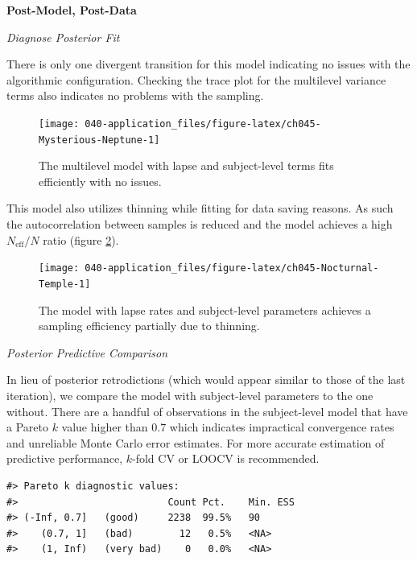 \documentclass[11pt, oneside, openany]{scrbook}
\begin{document}
\textbf{Post-Model, Post-Data}

\emph{Diagnose Posterior Fit}

There is only one divergent transition for this model indicating no issues with the algorithmic configuration. Checking the trace plot for the multilevel variance terms also indicates no problems with the sampling.

\begin{figure}

{\centering \texttt{[image: 040-application\_files/figure-latex/ch045-Mysterious-Neptune-1]} 

}

\caption{The multilevel model with lapse and subject-level terms fits efficiently with no issues.}\label{fig:ch045-Mysterious-Neptune}
\end{figure}

This model also utilizes thinning while fitting for data saving reasons. As such the autocorrelation between samples is reduced and the model achieves a high \(N_{\mathrm{eff}}/N\) ratio (figure \ref{fig:ch045-Nocturnal-Temple}).

\begin{figure}

{\centering \texttt{[image: 040-application\_files/figure-latex/ch045-Nocturnal-Temple-1]} 

}

\caption{The model with lapse rates and subject-level parameters achieves a sampling efficiency partially due to thinning.}\label{fig:ch045-Nocturnal-Temple}
\end{figure}

\emph{Posterior Predictive Comparison}

In lieu of posterior retrodictions (which would appear similar to those of the last iteration), we compare the model with subject-level parameters to the one without. There are a handful of observations in the subject-level model that have a Pareto \(k\) value higher than \(0.7\) which indicates impractical convergence rates and unreliable Monte Carlo error estimates. For more accurate estimation of predictive performance, \(k\)-fold CV or LOOCV is recommended.


\begin{verbatim}
#> Pareto k diagnostic values:
#>                          Count Pct.    Min. ESS
#> (-Inf, 0.7]   (good)     2238  99.5%   90      
#>    (0.7, 1]   (bad)        12   0.5%   <NA>    
#>    (1, Inf)   (very bad)    0   0.0%   <NA>
\end{verbatim}
\end{document}
